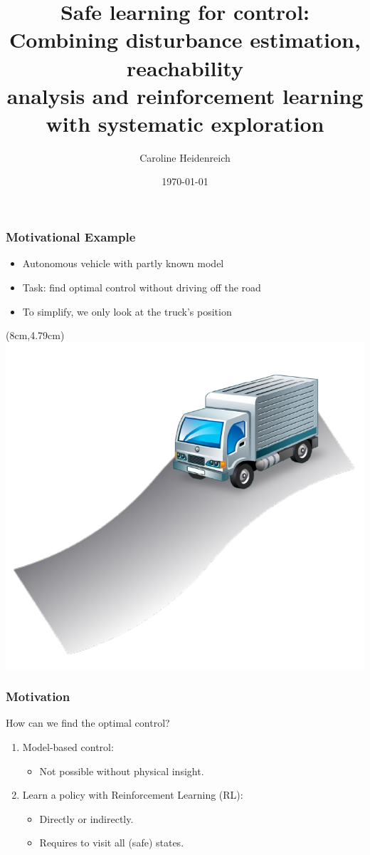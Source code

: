 \documentclass[t]{beamer}
\title[Inisintiur sequi aliquia tis dis in para] 
{%
  Safe learning for control: \\ \small{Combining disturbance estimation, reachability\\ analysis and reinforcement learning\\ with systematic exploration}%
}
\author[Oskar, Friends]
{
Caroline Heidenreich
}
\institute{}
\date{\today}
\begin{document}
\begin{frame}
\titlepage
\end{frame}


\begin{frame}
\frametitle{Motivational Example}
\begin{itemize}
\item Autonomous vehicle with partly known model
\item Task: find optimal control without driving off the road
\item To simplify, we only look at the truck's position
\end{itemize}
\begin{textblock*}{5cm}(8cm,4.79cm) %
\includegraphics[width=0.29\paperwidth]{TruckOnStreet}
\end{textblock*}
\end{frame}

\begin{frame}
\frametitle{Motivation}
How can we find the optimal control?
\vspace{0.5cm}
\begin{enumerate}
\item Model-based control:
\begin{itemize}
\item Not possible without physical insight.
\end{itemize}
\vspace{1cm}
\item Learn a policy with Reinforcement Learning (RL):
\begin{itemize}
\item Directly or indirectly.
\item Requires to visit all (safe) states.
\end{itemize}
\end{enumerate}

\end{frame}
\end{document}
